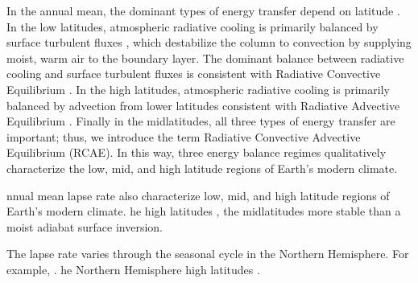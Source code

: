 \documentclass{ametsocV5}
\begin{document}
In the annual mean, the dominant types of energy transfer depend on latitude \citep[e.g., see Fig.~6.1 in][]{hartmann2016}. In the low latitudes, atmospheric radiative cooling is primarily balanced by surface turbulent fluxes \citep{riehl1958}, which destabilize the column to convection by supplying moist, warm air to the boundary layer. The dominant balance between radiative cooling and surface turbulent fluxes is consistent with Radiative Convective Equilibrium \citep[RCE,][]{wing2018}. In the high latitudes, atmospheric radiative cooling is primarily balanced by advection from lower latitudes \citep{nakamura1988} consistent with Radiative Advective Equilibrium \citep[RAE,][]{cronin2016}. Finally in the midlatitudes, all three types of energy transfer are important; thus, we introduce the term Radiative Convective Advective Equilibrium (RCAE). In this way, three energy balance regimes qualitatively characterize the low, mid, and high latitude regions of Earth's modern climate.

nnual mean lapse rate  also characterize low, mid, and high latitude regions of Earth's modern climate.  \citep{stone1979,betts1982,xu1989,williams1993}he high latitudes  \citep[e.g., see Fig.~1.3 in][]{hartmann2016}, the midlatitudes  more stable than a moist adiabat \citep{stone1979,korty2007}  surface inversion.

The lapse rate  varies through the seasonal cycle in the Northern Hemisphere. For example,  \citep{stone1979}. he Northern Hemisphere high latitudes \citep{bradley1992, tjernstrom2009, devasthale2010, zhang2011, cronin2016}.
\end{document}
